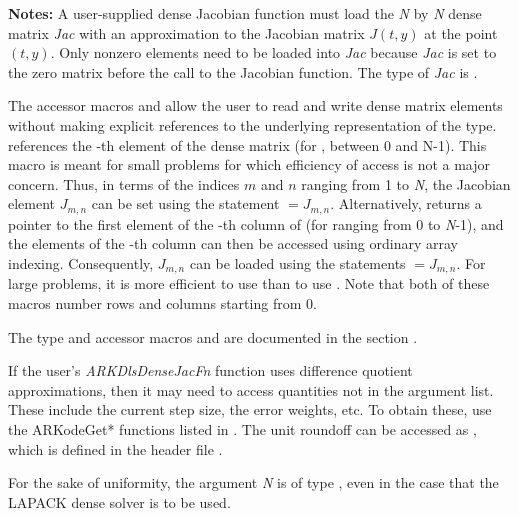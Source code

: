 \documentclass[letterpaper,10pt,english]{sphinxmanual}
\begin{document}
\begin{fulllineitems}
\textbf{Notes:} A user-supplied dense Jacobian function must load the
\emph{N} by \emph{N} dense matrix \emph{Jac} with an approximation to the Jacobian
matrix \(J(t,y)\) at the point \((t,y)\). Only nonzero
elements need to be loaded into \emph{Jac} because \emph{Jac} is set to
the zero matrix before the call to the Jacobian function. The type
of \emph{Jac} is .

The accessor macros  and  allow the user
to read and write dense matrix elements without making explicit
references to the underlying representation of the 
type.  references the -th element of
the dense matrix  (for ,  between 0 and
N-1). This macro is meant for small problems for which
efficiency of access is not a major concern. Thus, in terms of the
indices \(m\) and \(n\) ranging from 1 to \emph{N}, the
Jacobian element \(J_{m,n}\) can be set using the statement
 \(= J_{m,n}\). Alternatively,
 returns a pointer to the first element of the
-th column of  (for  ranging from 0 to \emph{N}-1),
and the elements of the -th column can then be accessed using
ordinary array indexing. Consequently, \(J_{m,n}\) can be
loaded using the statements  \(= J_{m,n}\). For large problems, it is more
efficient to use  than to use . Note
that both of these macros number rows and columns starting from 0.

The  type and accessor macros  and
 are documented in the section {\hyperref[linear_solvers/index:linearsolvers]{\emph{}}}.

If the user's \emph{ARKDlsDenseJacFn} function uses difference quotient
approximations, then it may need to access quantities not in the
argument list. These include the current step size, the error
weights, etc.  To obtain these, use the ARKodeGet* functions
listed in {\hyperref[c_interface/User_callable:cinterface-optionaloutputs]{\emph{}}}. The unit roundoff
can be accessed as , which is defined in the
header file .

For the sake of uniformity, the argument \emph{N} is of type ,
even in the case that the LAPACK dense solver is to be used.

\end{fulllineitems}
\end{document}
